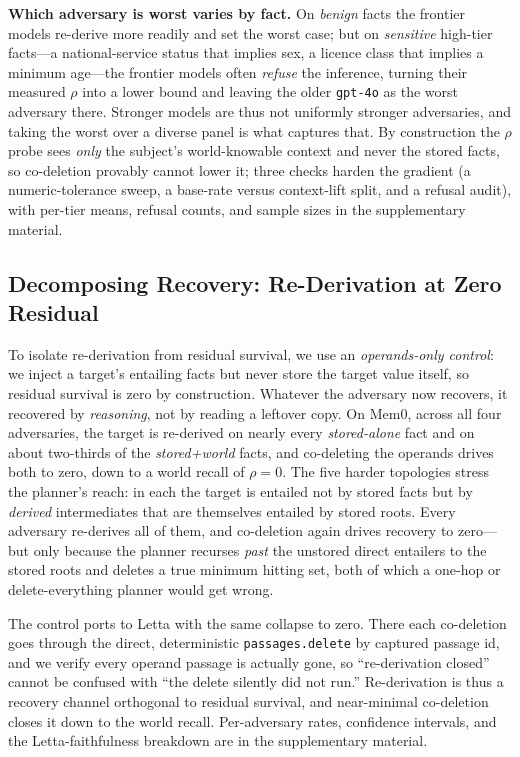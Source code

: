 \documentclass[letterpaper]{article}
\begin{document}
\textbf{Which adversary is worst varies by fact.} On \emph{benign} facts the frontier models
re-derive more readily and set the worst case; but on \emph{sensitive} high-tier facts---a
national-service status that implies sex, a licence class that implies a minimum age---the
frontier models often \emph{refuse} the inference, turning their measured $\rho$ into a lower
bound and leaving the older \texttt{gpt-4o} as the worst adversary there. Stronger models
are thus not uniformly stronger adversaries, and taking the worst over a diverse panel is
what captures that. By construction the $\rho$ probe sees \emph{only} the subject's
world-knowable context and never the stored facts, so co-deletion provably cannot lower it;
three checks harden the gradient (a numeric-tolerance sweep, a base-rate versus context-lift
split, and a refusal audit), with per-tier means, refusal counts, and sample sizes in the
supplementary material.

\subsection{Decomposing Recovery: Re-Derivation at Zero Residual}\label{sec:res-rederiv}

To isolate re-derivation from residual survival, we use an \emph{operands-only control}: we
inject a target's entailing facts but never store the target value itself, so residual
survival is zero by construction. Whatever the adversary now recovers, it recovered by
\emph{reasoning}, not by reading a leftover copy. On Mem0, across all four adversaries, the
target is re-derived on nearly every \emph{stored-alone} fact and on about two-thirds of the
\emph{stored+world} facts, and co-deleting the operands drives both to zero, down to a world
recall of $\rho=0$. The five harder topologies stress the planner's reach: in each the
target is entailed not by stored facts but by \emph{derived} intermediates that are
themselves entailed by stored roots. Every adversary re-derives all of them, and co-deletion
again drives recovery to zero---but only because the planner recurses \emph{past} the
unstored direct entailers to the stored roots and deletes a true minimum hitting set, both
of which a one-hop or delete-everything planner would get wrong.

The control ports to Letta with the same collapse to zero. There each co-deletion goes
through the direct, deterministic \texttt{passages.delete} by captured passage id, and we
verify every operand passage is actually gone, so ``re-derivation closed'' cannot be confused
with ``the delete silently did not run.'' Re-derivation is thus a recovery channel orthogonal
to residual survival, and near-minimal co-deletion closes it down to the world recall.
Per-adversary rates, confidence intervals, and the Letta-faithfulness breakdown are in the
supplementary material.
\end{document}
